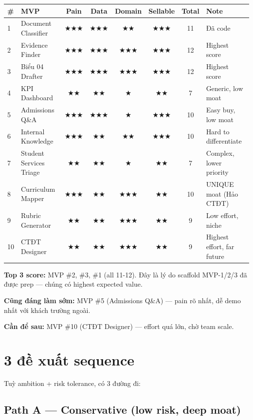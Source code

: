 \documentclass[11pt,a4paper]{article}
\begin{document}
\begin{tabularx}{\linewidth}{@{}p{0.4cm} p{3.5cm} c c c c c X@{}}
\toprule
\textbf{\#} & \textbf{MVP} & \textbf{Pain} & \textbf{Data} & \textbf{Domain} & \textbf{Sellable} & \textbf{Total} & \textbf{Note} \\
\midrule
1 & Document Classifier & ★★★ & ★★★ & ★★ & ★★★ & 11 & Đã code \\
2 & Evidence Finder & ★★★ & ★★★ & ★★★ & ★★★ & 12 & Highest score \\
3 & Biểu 04 Drafter & ★★★ & ★★★ & ★★★ & ★★★ & 12 & Highest score \\
4 & KPI Dashboard & ★★ & ★★ & ★ & ★★ & 7 & Generic, low moat \\
5 & Admissions Q\&A & ★★★ & ★★★ & ★ & ★★★ & 10 & Easy buy, low moat \\
6 & Internal Knowledge & ★★★ & ★★ & ★★ & ★★★ & 10 & Hard to differentiate \\
7 & Student Services Triage & ★★ & ★★ & ★ & ★★ & 7 & Complex, lower priority \\
8 & Curriculum Mapper & ★★★ & ★★ & ★★★ & ★★ & 10 & UNIQUE moat (Hảo CTĐT) \\
9 & Rubric Generator & ★★ & ★★ & ★★★ & ★★ & 9 & Low effort, niche \\
10 & CTĐT Designer & ★★ & ★★ & ★★★ & ★★ & 9 & Highest effort, far future \\
\bottomrule
\end{tabularx}

\textbf{Top 3 score:} MVP \#2, \#3, \#1 (all 11-12). Đây là lý do scaffold MVP-1/2/3
đã được prep --- chúng có highest expected value.

\textbf{Cũng đáng làm sớm:} MVP \#5 (Admissions Q\&A) --- pain rõ nhất, dễ demo nhất với khách trường ngoài.

\textbf{Cần để sau:} MVP \#10 (CTĐT Designer) --- effort quá lớn, chờ team scale.

\clearpage

\section{3 đề xuất sequence}

Tuỳ ambition + risk tolerance, có 3 đường đi:

\subsection{Path A --- Conservative (low risk, deep moat)}
\end{document}
